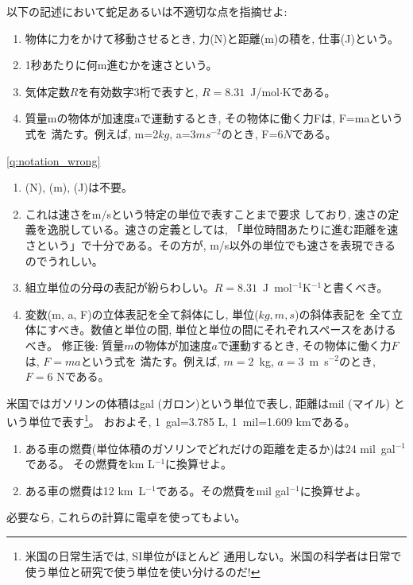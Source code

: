 \begin{q}\label{q:notation_wrong} 以下の記述において蛇足あるいは不適切な点を指摘せよ:
\begin{enumerate}
\item 物体に力をかけて移動させるとき, 力(N)と距離(m)の積を, 仕事(J)という。
\item 1秒あたりに何m進むかを速さという。
\item 気体定数$R$を有効数字3桁で表すと, $R=8.31$~J/mol$\cdot$Kである。 
\item 質量mの物体が加速度aで運動するとき, その物体に働く力Fは, F=maという式を
満たす。例えば, m=2$kg$, a=3$ms^{-2}$のとき, F=6$N$である。
\end{enumerate}
\end{q}

\ref{q:notation_wrong}
\begin{enumerate}
\item (N), (m), (J)は不要。
\item これは速さをm/sという特定の単位で表すことまで要求
しており, 速さの定義を逸脱している。速さの定義としては, 
「単位時間あたりに進む距離を速さという」で十分である。その方が, 
m/s以外の単位でも速さを表現できるのでうれしい。
\item 組立単位の分母の表記が紛らわしい。$R=8.31$~J~mol$^{-1}$K$^{-1}$と書くべき。
\item 変数(m, a, F)の立体表記を全て斜体にし, 単位($kg, m, s$)の斜体表記を
全て立体にすべき。数値と単位の間, 単位と単位の間にそれぞれスペースをあけるべき。
修正後: 質量$m$の物体が加速度$a$で運動するとき, その物体に働く力$F$は, $F=ma$という式を
満たす。例えば, $m=2$~kg, $a=3$~m~s$^{-2}$のとき, $F=6$ Nである。
\end{enumerate}




\begin{q}\label{q:unit_conv1}
米国ではガソリンの体積はgal (ガロン)という単位で表し, 距離はmil (マイル)
という単位で表す\footnote{米国の日常生活では, SI単位がほとんど
通用しない。米国の科学者は日常で使う単位と研究で使う単位を使い分けるのだ!}。
おおよそ, 1~gal=3.785 L, 1~mil=1.609 kmである。
\begin{enumerate}
\item ある車の燃費(単位体積のガソリンでどれだけの距離を走るか)は24 mil~gal$^{-1}$である。
その燃費をkm L$^{-1}$に換算せよ。
\item ある車の燃費は12 km~L$^{-1}$である。その燃費をmil gal$^{-1}$に換算せよ。
\end{enumerate}
必要なら, これらの計算に電卓を使ってもよい。
\end{q}
\mv

